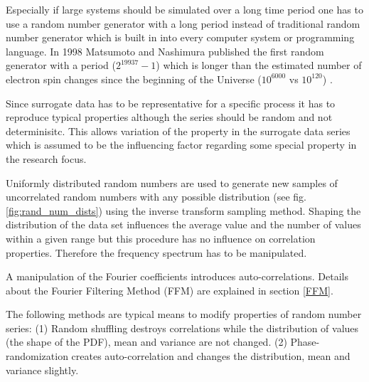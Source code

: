 \documentclass[a4paper,10pt]{scrbook}
\begin{document}
Especially if large systems should be simulated over a long time period one has to use a random number generator with a long period instead of traditional random number generator which is built in into every computer system or programming language. In 1998 Matsumoto and Nashimura \cite{Matsumoto1998} published the first random generator with a period ($2^{19937}-1$) which is longer than the estimated number of electron spin changes since the beginning of the Universe ($10^{6000}$ vs $10^{120}$) \cite{Rrandtoolbox}.  

Since surrogate data has to be representative for a specific process it has to reproduce typical properties although the series should be random and not determinisitc. This allows variation of the property in the 
surrogate data series which is assumed to be the influencing factor regarding some special property in the research focus.

Uniformly distributed random numbers are used to generate new samples of uncorrelated random
numbers with any possible distribution (see fig. \ref{fig:rand_num_dists}) using the inverse transform sampling method. Shaping the distribution of the data set influences the average value and
the number of values within a given range but this procedure has no influence on
correlation properties. Therefore the frequency spectrum has to be manipulated.

A manipulation of the Fourier coefficients introduces auto-correlations. Details about the Fourier Filtering Method (FFM) are explained in section \ref{FFM}.

The following methods are typical means to modify properties of random number series:
(1) Random shuffling destroys correlations while the distribution of values (the shape of the PDF), mean and variance are not changed. 
(2) Phase-randomization creates auto-correlation and changes the distribution, mean and variance slightly. 

\end{document}

